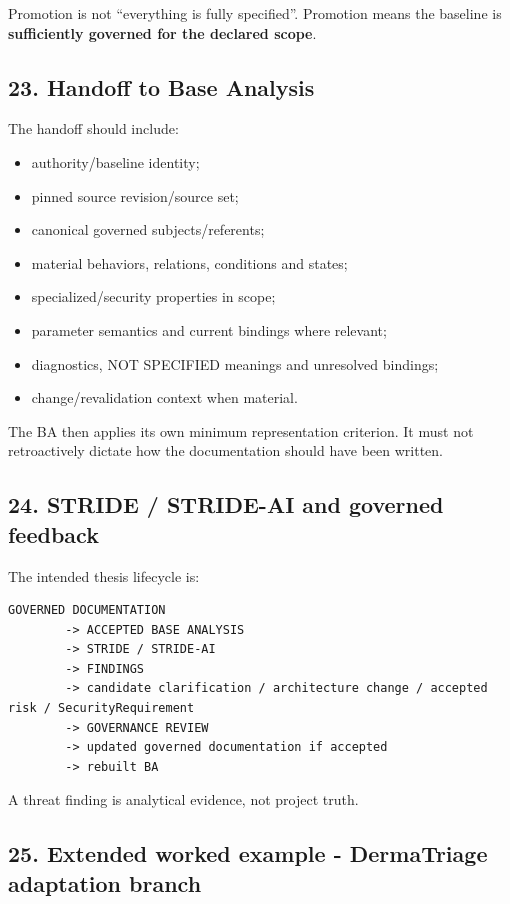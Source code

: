 \documentclass[11pt,a4paper]{article}
\providecommand{\tightlist}{\setlength{\itemsep}{0pt}\setlength{\parskip}{0pt}}
\begin{document}
Promotion is not ``everything is fully specified''. Promotion means the
baseline is \textbf{sufficiently governed for the declared scope}.

\subsection{23. Handoff to Base
Analysis}\label{23-handoff-to-base-analysis}

The handoff should include:

\begin{itemize}
\tightlist
\item
  authority/baseline identity;
\item
  pinned source revision/source set;
\item
  canonical governed subjects/referents;
\item
  material behaviors, relations, conditions and states;
\item
  specialized/security properties in scope;
\item
  parameter semantics and current bindings where relevant;
\item
  diagnostics, NOT SPECIFIED meanings and unresolved bindings;
\item
  change/revalidation context when material.
\end{itemize}

The BA then applies its own minimum representation criterion. It must
not retroactively dictate how the documentation should have been
written.

\subsection{24. STRIDE / STRIDE-AI and governed
feedback}\label{24-stride--stride-ai-and-governed-feedback}

The intended thesis lifecycle is:

\begin{verbatim}
GOVERNED DOCUMENTATION
        -> ACCEPTED BASE ANALYSIS
        -> STRIDE / STRIDE-AI
        -> FINDINGS
        -> candidate clarification / architecture change / accepted risk / SecurityRequirement
        -> GOVERNANCE REVIEW
        -> updated governed documentation if accepted
        -> rebuilt BA
\end{verbatim}

A threat finding is analytical evidence, not project truth.

\subsection{25. Extended worked example - DermaTriage adaptation
branch}\label{25-extended-worked-example---dermatriage-adaptation-branch}
\end{document}
